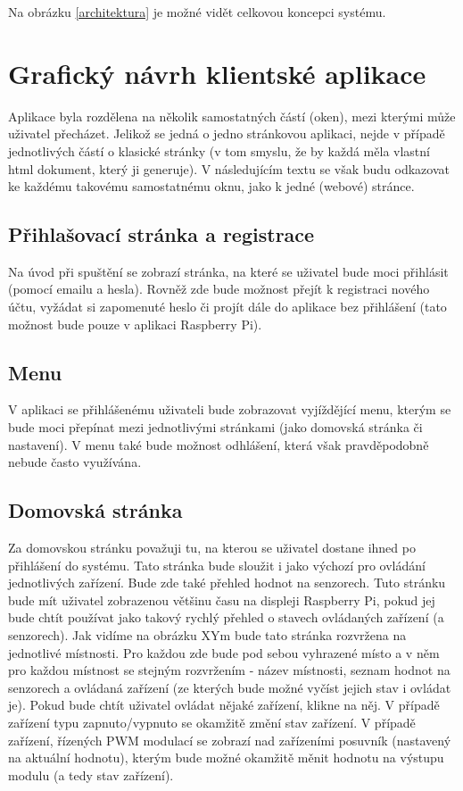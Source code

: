 Na obrázku \ref{architektura} je možné vidět celkovou koncepci systému.


\section{Grafický návrh klientské aplikace}
Aplikace byla rozdělena na několik samostatných částí (oken), mezi kterými může uživatel přecházet. Jelikož se jedná o jedno stránkovou aplikaci, nejde v případě jednotlivých částí o klasické stránky (v tom smyslu, že by každá měla vlastní html dokument, který ji generuje). V následujícím textu se však budu odkazovat ke každému takovému samostatnému oknu, jako k jedné (webové) stránce.
\subsection*{Přihlašovací stránka a registrace}
Na úvod při spuštění se zobrazí stránka, na které se uživatel bude moci přihlásit (pomocí emailu a hesla). Rovněž zde bude možnost přejít k registraci nového účtu, vyžádat si zapomenuté heslo či projít dále do aplikace bez přihlášení (tato možnost bude pouze v aplikaci Raspberry Pi).

\subsection*{Menu}
V aplikaci se přihlášenému uživateli bude zobrazovat vyjíždějící menu, kterým se bude moci přepínat mezi jednotlivými stránkami (jako domovská stránka či nastavení). V menu také bude možnost odhlášení, která však pravděpodobně nebude často využívána.
\subsection*{Domovská stránka}
Za domovskou stránku považuji tu, na kterou se uživatel dostane ihned po přihlášení do systému. Tato stránka bude sloužit i jako výchozí pro ovládání jednotlivých zařízení. Bude zde také přehled hodnot na senzorech. Tuto stránku bude mít uživatel zobrazenou většinu času na displeji Raspberry Pi, pokud jej bude chtít používat jako takový rychlý přehled o stavech ovládaných zařízení (a senzorech).
Jak vidíme na obrázku XYm bude tato stránka rozvržena na jednotlivé místnosti. Pro každou zde bude pod sebou vyhrazené místo a v něm pro každou místnost se stejným rozvržením - název místnosti, seznam hodnot na senzorech a ovládaná zařízení (ze kterých bude možné vyčíst jejich stav i ovládat je). Pokud bude chtít uživatel ovládat nějaké zařízení, klikne na něj. V případě zařízení typu zapnuto/vypnuto se okamžitě změní stav zařízení. V případě zařízení, řízených PWM modulací se zobrazí nad zařízeními posuvník (nastavený na aktuální hodnotu), kterým bude možné okamžitě měnit hodnotu na výstupu modulu (a tedy stav zařízení).


